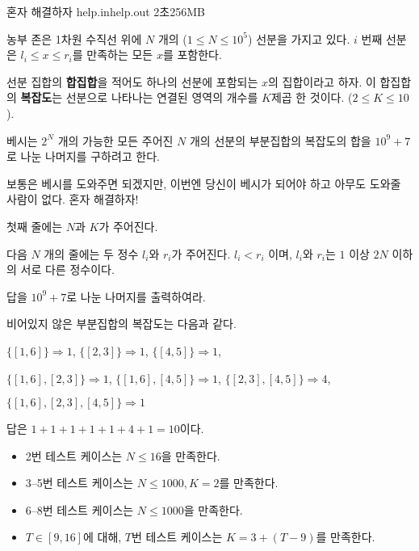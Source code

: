 \begin{problem}{혼자 해결하자} %
	{help.in}{help.out}
	{2초}{256MB}{}
	
	농부 존은 1차원 수직선 위에 $N$ 개의 ($1 \le N \le 10^5$) 선분을 가지고 있다. $i$ 번째 선분은 $l_i \le x \le r_i$를 만족하는 모든 $x$를 포함한다.
	
	선분 집합의 \textbf{합집합}을 적어도 하나의 선분에 포함되는 $x$의 집합이라고 하자. 이 합집합의 \textbf{복잡도}는 선분으로 나타나는 연결된 영역의 개수를 $K$제곱 한 것이다. ($2 \le K \le 10$).
	
	베시는 $2^N$ 개의 가능한 모든 주어진 $N$ 개의 선분의 부분집합의 복잡도의 합을 $10^9+7$로 나눈 나머지를 구하려고 한다. 
	
	보통은 베시를 도와주면 되겠지만, 이번엔 당신이 베시가 되어야 하고 아무도 도와줄 사람이 없다. 혼자 해결하자!
	
	\InputFile
	
	첫째 줄에는 $N$과 $K$가 주어진다.
	
	다음 $N$ 개의 줄에는 두 정수 $l_i$와 $r_i$가 주어진다. $l_i < r_i$ 이며, $l_i$와 $r_i$는 $1$ 이상 $2N$ 이하의 서로 다른 정수이다.
	
	\OutputFile
	
	답을 $10^9+7$로 나눈 나머지를 출력하여라.
	
	\Example
		
	\begin{example}
	\end{example}
	
	비어있지 않은 부분집합의 복잡도는 다음과 같다.
	
	\begin{center}
		$\{[1, 6]\} \Rightarrow 1$, $\{[2, 3]\} \Rightarrow 1$, $\{[4, 5]\} \Rightarrow 1$,
		
		$\{[1, 6], [2, 3]\} \Rightarrow 1$, $\{[1, 6], [4, 5]\} \Rightarrow 1$, $\{[2, 3], [4, 5]\} \Rightarrow 4$,
		
		$\{[1, 6], [2, 3], [4, 5]\} \Rightarrow 1$
	\end{center}
	
	답은 $1+1+1+1+1+4+1 = 10$이다.
	
	\Scoring
	
	\begin{itemize}
		\item 2번 테스트 케이스는 $N \le 16$을 만족한다.
		\item 3--5번 테스트 케이스는 $N \le 1000, K=2$를 만족한다.
		\item 6--8번 테스트 케이스는 $N \le 1000$을 만족한다.
		\item $T \in [9, 16]$에 대해, $T$번 테스트 케이스는 $K=3+(T-9)$를 만족한다.
	\end{itemize}
	
	
	
	
\end{problem}

